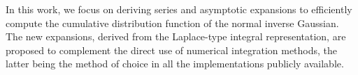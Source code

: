 \documentclass[10pt,a4paper,oneside]{article}
\numberwithin{equation}{section}
\begin{document}
%
%

In this work, we focus on deriving series and asymptotic expansions to efficiently compute the cumulative distribution function of the normal inverse Gaussian. The new expansions, derived from the Laplace-type integral representation, are proposed to complement the direct use of numerical integration methods, the latter being the method of choice in all the implementations publicly available. 
\end{document}
